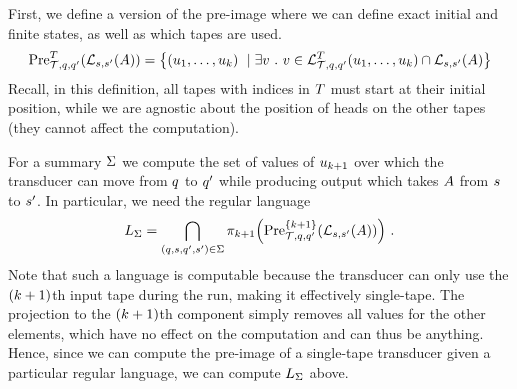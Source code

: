 First, we define a version of the pre-image where we can define exact initial and finite states, as well as which tapes are used.
\[
    \preimageidx{\ducer}{\tstate}{\tstate'}{\tidxs}{
        \alangofstates{\aut}{\astate}{\astate'}
    } =
    \setcomp{
        \tup{\iword_1, \ldots, \iword_\numtapes}
    }{
        \exists \oword\ .\ %
            \oword \in
                \tlangofidx{\ducer}
                           {\tstate}
                           {\tstate'}
                           {\tidxs}
                           {\iword_1, \ldots, \iword_\numtapes}
                \cap
                \alangofstates{\aut}{\astate}{\astate'}
    }
\]
Recall, in this definition, all tapes with indices in $\tidxs$ must start at their initial position, while we are agnostic about the position of heads on the other tapes (they cannot affect the computation).

For a summary $\summary$ we compute the set of values of
$\iword_{\numtapes+1}$
over which the transducer can move from $\tstate$ to $\tstate'$ while producing output which takes $\aut$ from $\astate$ to $\astate'$.
In particular, we need the regular language
\[
    \lang_\summary =
        \bigcap\limits_{
            \tup{\tstate, \astate, \tstate', \astate'}
            \in
            \summary
        }
        \ap{\proj{\numtapes+1}}{
            \preimageidx{\ducer}{\tstate}{\tstate'}{\set{\numtapes+1}}{
                \alangofstates{\aut}{\astate}{\astate'}
            }
        } \ .
\]
Note that such a language is computable because the transducer can only use the
$(\numtapes+1)$th
input tape during the run, making it effectively single-tape.
The projection to the
$(\numtapes+1)$th
component simply removes all values for the other elements, which have no effect on the computation and can thus be anything.
Hence, since we can compute the pre-image of a single-tape transducer given a particular regular language, we can compute $\lang_\summary$ above.

